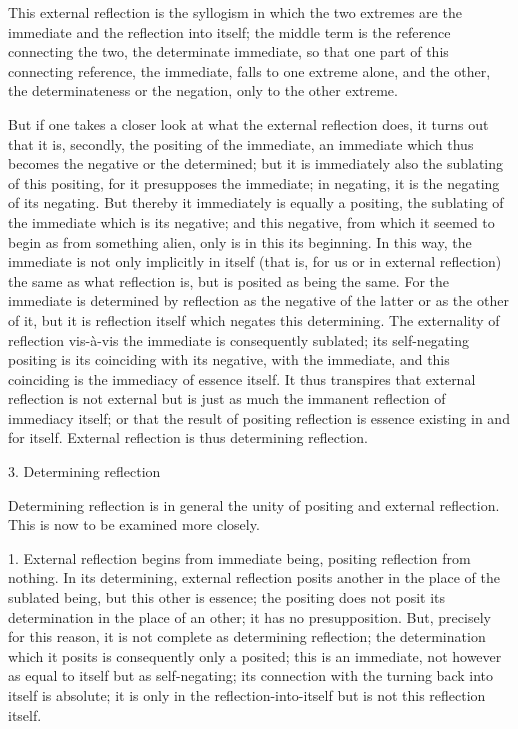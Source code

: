 This external reflection is the syllogism
in which the two extremes are
the immediate and the reflection into itself;
the middle term is the reference connecting the two,
the determinate immediate, so that one part of this connecting reference,
the immediate, falls to one extreme alone, and the other,
the determinateness or the negation, only to the other extreme.

But if one takes a closer look at what the external reflection does,
it turns out that it is, secondly, the positing of the immediate,
an immediate which thus becomes the negative or the determined;
but it is immediately also the sublating of this positing,
for it presupposes the immediate;
in negating, it is the negating of its negating.
But thereby it immediately is equally a positing,
the sublating of the immediate which is its negative;
and this negative, from which it seemed to begin
as from something alien,
only is in this its beginning.
In this way, the immediate is not only implicitly in itself
(that is, for us or in external reflection)
the same as what reflection is,
but is posited as being the same.
For the immediate is determined by reflection as
the negative of the latter or as the other of it,
but it is reflection itself which negates this determining.
The externality of reflection vis-à-vis
the immediate is consequently sublated;
its self-negating positing is its coinciding
with its negative, with the immediate,
and this coinciding is the immediacy of essence itself.
It thus transpires that external reflection is not external
but is just as much the immanent reflection of immediacy itself;
or that the result of positing reflection is
essence existing in and for itself.
External reflection is thus determining reflection.

3. Determining reflection

Determining reflection is in general
the unity of positing and external reflection.
This is now to be examined more closely.

1. External reflection begins from immediate being,
positing reflection from nothing.
In its determining, external reflection posits another in the
place of the sublated being, but this other is essence;
the positing does not posit its determination in the place of an other;
it has no presupposition.
But, precisely for this reason,
it is not complete as determining reflection;
the determination which it posits is consequently only a posited;
this is an immediate, not however as equal to itself
but as self-negating;
its connection with the turning back into itself is absolute;
it is only in the reflection-into-itself
but is not this reflection itself.

